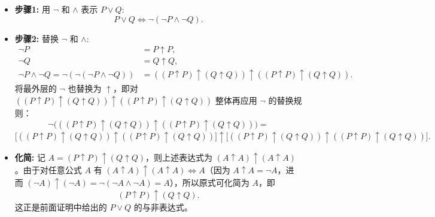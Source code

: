 \documentclass[lang=cn,11pt]{elegantbook}
\begin{document}
\begin{itemize}
    \item \textbf{步骤1:} 用 $\neg$ 和 $\land$ 表示 $P \lor Q$:
    \[
    P \lor Q \Leftrightarrow \neg(\neg P \land \neg Q).
    \]
    \item \textbf{步骤2:} 替换 $\neg$ 和 $\land$:
    \begin{align*}
        \neg P &=P \uparrow P, \\
        \neg Q &= Q \uparrow Q, \\
        \neg P \land \neg Q =\neg(\neg(\neg P \land \neg Q))&=((P \uparrow P) \uparrow (Q \uparrow Q)) \uparrow ((P \uparrow P) \uparrow (Q \uparrow Q)).
    \end{align*}
    将最外层的 $\neg$ 也替换为 $\uparrow$，即对 $((P \uparrow P) \uparrow (Q \uparrow Q)) \uparrow ((P \uparrow P) \uparrow (Q \uparrow Q))$ 整体再应用 $\neg$ 的替换规则：
    \[
    \neg\Big(((P \uparrow P) \uparrow (Q \uparrow Q)) \uparrow ((P \uparrow P) \uparrow (Q \uparrow Q))\Big) =\]
    \[\Big[((P \uparrow P) \uparrow (Q \uparrow Q)) \uparrow ((P \uparrow P) \uparrow (Q \uparrow Q))\Big] \uparrow \Big[((P \uparrow P) \uparrow (Q \uparrow Q)) \uparrow ((P \uparrow P) \uparrow (Q \uparrow Q))\Big].
    \]
    \item \textbf{化简:} 记 $A = (P \uparrow P) \uparrow (Q \uparrow Q)$，则上述表达式为 $(A \uparrow A) \uparrow (A \uparrow A)$。由于对任意公式 $A$ 有 $(A \uparrow A) \uparrow (A \uparrow A) \Leftrightarrow A$（因为 $A \uparrow A = \neg A$，进而 $(\neg A) \uparrow (\neg A) = \neg(\neg A \land \neg A) = A$），所以原式可化简为 $A$，即
    \[
    (P \uparrow P) \uparrow (Q \uparrow Q).
    \]
    这正是前面证明中给出的 $P \lor Q$ 的与非表达式。
\end{itemize}
\end{document}
